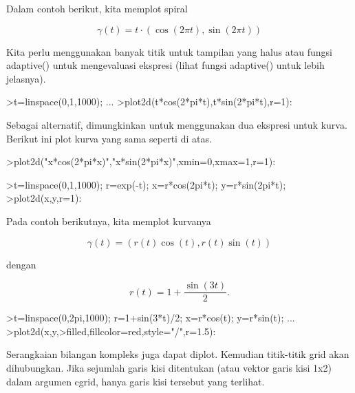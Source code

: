 \documentclass[a4paper,10pt]{article}
\begin{document}
\begin{eulernotebook}
\begin{eulercomment}
\begin{eulercomment}
\begin{eulercomment}
\begin{eulercomment}
\begin{eulercomment}
\begin{eulercomment}
\begin{eulercomment}
Dalam contoh berikut, kita memplot spiral

\end{eulercomment}
\begin{eulerformula}
\[
\gamma(t) = t \cdot (\cos(2\pi t),\sin(2\pi t))
\]
\end{eulerformula}
\begin{eulercomment}
Kita perlu menggunakan banyak titik untuk tampilan yang halus atau
fungsi adaptive() untuk mengevaluasi ekspresi (lihat fungsi adaptive()
untuk lebih jelasnya).
\end{eulercomment}
\begin{eulerprompt}
>t=linspace(0,1,1000); ...
>plot2d(t*cos(2*pi*t),t*sin(2*pi*t),r=1):
\end{eulerprompt}
\begin{eulercomment}
Sebagai alternatif, dimungkinkan untuk menggunakan dua ekspresi untuk
kurva. Berikut ini plot kurva yang sama seperti di atas.
\end{eulercomment}
\begin{eulerprompt}
>plot2d("x*cos(2*pi*x)","x*sin(2*pi*x)",xmin=0,xmax=1,r=1):
\end{eulerprompt}
\begin{eulerprompt}
>t=linspace(0,1,1000); r=exp(-t); x=r*cos(2pi*t); y=r*sin(2pi*t);
>plot2d(x,y,r=1):
\end{eulerprompt}
\begin{eulercomment}
Pada contoh berikutnya, kita memplot kurvanya

\end{eulercomment}
\begin{eulerformula}
\[
\gamma(t) = (r(t) \cos(t), r(t) \sin(t))
\]
\end{eulerformula}
\begin{eulercomment}
dengan

\end{eulercomment}
\begin{eulerformula}
\[
r(t) = 1 + \dfrac{\sin(3t)}{2}.
\]
\end{eulerformula}
\begin{eulerprompt}
>t=linspace(0,2pi,1000); r=1+sin(3*t)/2; x=r*cos(t); y=r*sin(t); ...
>plot2d(x,y,>filled,fillcolor=red,style="/",r=1.5):
\end{eulerprompt}
\begin{eulercomment}
Serangkaian bilangan kompleks juga dapat diplot. Kemudian titik-titik
grid akan dihubungkan. Jika sejumlah garis kisi ditentukan (atau
vektor garis kisi 1x2) dalam argumen cgrid, hanya garis kisi tersebut
yang terlihat.


\end{eulercomment}
\end{eulercomment}
\end{eulercomment}
\end{eulercomment}
\end{eulercomment}
\end{eulercomment}
\end{eulercomment}
\end{eulernotebook}
\end{document}
